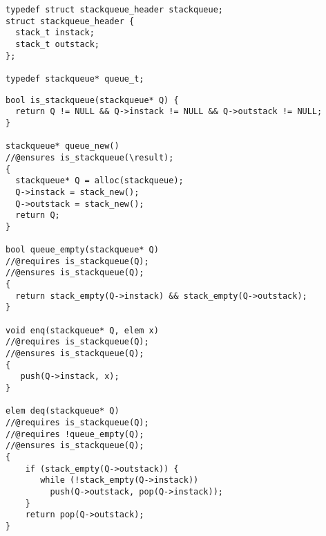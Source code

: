 \begin{lstlisting}[numbers=none]
typedef struct stackqueue_header stackqueue;
struct stackqueue_header {
  stack_t instack;
  stack_t outstack;
};

typedef stackqueue* queue_t;
\end{lstlisting}
\clearpage
\begin{lstlisting}[numbers=none]
bool is_stackqueue(stackqueue* Q) {
  return Q != NULL && Q->instack != NULL && Q->outstack != NULL;
}

stackqueue* queue_new()
//@ensures is_stackqueue(\result);
{
  stackqueue* Q = alloc(stackqueue);
  Q->instack = stack_new();
  Q->outstack = stack_new();
  return Q;
}

bool queue_empty(stackqueue* Q)
//@requires is_stackqueue(Q);
//@ensures is_stackqueue(Q);
{
  return stack_empty(Q->instack) && stack_empty(Q->outstack);
}

void enq(stackqueue* Q, elem x)
//@requires is_stackqueue(Q);
//@ensures is_stackqueue(Q);
{
   push(Q->instack, x);
}

elem deq(stackqueue* Q)
//@requires is_stackqueue(Q);
//@requires !queue_empty(Q);
//@ensures is_stackqueue(Q);
{
    if (stack_empty(Q->outstack)) {
       while (!stack_empty(Q->instack))
         push(Q->outstack, pop(Q->instack));
    }
    return pop(Q->outstack);
}
\end{lstlisting}

